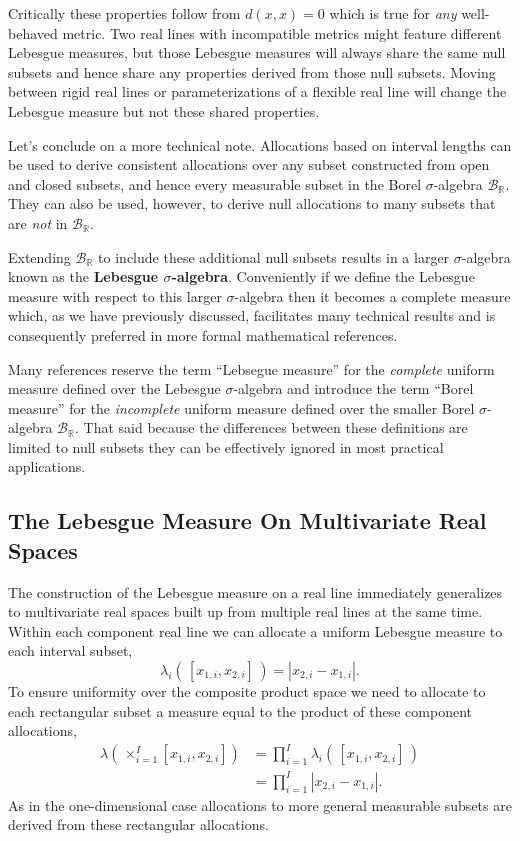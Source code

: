 \documentclass[
  letterpaper,
  DIV=11,
  numbers=noendperiod]{scrartcl}
\begin{document}
Critically these properties follow from \(d(x, x) = 0\) which is true
for \emph{any} well-behaved metric. Two real lines with incompatible
metrics might feature different Lebesgue measures, but those Lebesgue
measures will always share the same null subsets and hence share any
properties derived from those null subsets. Moving between rigid real
lines or parameterizations of a flexible real line will change the
Lebesgue measure but not these shared properties.

Let's conclude on a more technical note. Allocations based on interval
lengths can be used to derive consistent allocations over any subset
constructed from open and closed subsets, and hence every measurable
subset in the Borel \(\sigma\)-algebra \(\mathcal{B}_{\mathbb{R}}\).
They can also be used, however, to derive null allocations to many
subsets that are \emph{not} in \(\mathcal{B}_{\mathbb{R}}\).

Extending \(\mathcal{B}_{\mathbb{R}}\) to include these additional null
subsets results in a larger \(\sigma\)-algebra known as the
\textbf{Lebesgue \(\sigma\)-algebra}. Conveniently if we define the
Lebesgue measure with respect to this larger \(\sigma\)-algebra then it
becomes a complete measure which, as we have previously discussed,
facilitates many technical results and is consequently preferred in more
formal mathematical references.

Many references reserve the term ``Lebsegue measure'' for the
\emph{complete} uniform measure defined over the Lebesgue
\(\sigma\)-algebra and introduce the term ``Borel measure'' for the
\emph{incomplete} uniform measure defined over the smaller Borel
\(\sigma\)-algebra \(\mathcal{B}_{\mathbb{R}}\). That said because the
differences between these definitions are limited to null subsets they
can be effectively ignored in most practical applications.

\hypertarget{the-lebesgue-measure-on-multivariate-real-spaces}{%
\subsection{The Lebesgue Measure On Multivariate Real
Spaces}\label{the-lebesgue-measure-on-multivariate-real-spaces}}

The construction of the Lebesgue measure on a real line immediately
generalizes to multivariate real spaces built up from multiple real
lines at the same time. Within each component real line we can allocate
a uniform Lebesgue measure to each interval subset, \[
\lambda_{i}( \, [x_{1, i}, x_{2, i}] \, )
= | x_{2, i} - x_{1, i} |.
\] To ensure uniformity over the composite product space we need to
allocate to each rectangular subset a measure equal to the product of
these component allocations, \begin{align*}
\lambda( \, \times_{i = 1}^{I} [ x_{1, i}, x_{2, i} ] )
&=
\prod_{i = 1}^{I} \lambda_{i}( \, [x_{1, i}, x_{2, i}] \, )
\\
&=
\prod_{i = 1}^{I} | x_{2, i} - x_{1, i} |.
\end{align*} As in the one-dimensional case allocations to more general
measurable subsets are derived from these rectangular allocations.
\end{document}
